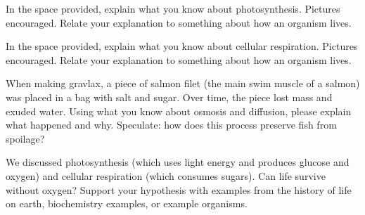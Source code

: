 \documentclass[exam,addpoints]{exam}
\begin{document}
\begin{questions}
\clearpage
\question[23] In the space provided, explain what you know about photosynthesis. Pictures encouraged. Relate your explanation to something about how an organism lives.
\begin{solution}[6in]
\end{solution}

\clearpage
\question[23] In the space provided, explain what you know about cellular respiration. Pictures encouraged. Relate your explanation to something about how an organism lives. 
\begin{solution}[6in]
\end{solution}

\clearpage
\question[22] When making gravlax, a piece of salmon filet (the main swim muscle of a salmon) was placed in a bag with salt and sugar. Over time, the piece lost mass and exuded water. Using what you know about osmosis and diffusion, please explain what happened and why. Speculate: how does this process preserve fish from spoilage? 
\begin{solution}[6in]
\end{solution}

\clearpage
\question[22] We discussed photosynthesis (which uses light energy and produces glucose and oxygen) and cellular respiration (which consumes sugars).  Can life survive without oxygen? Support your hypothesis with examples from the history of life on earth, biochemistry examples, or example organisms. 
\begin{solution}[6in]
\end{solution}

\end{questions}
\end{document}
